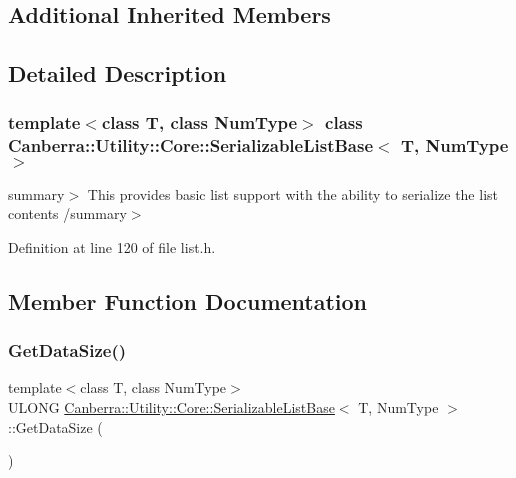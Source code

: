 \subsection*{Additional Inherited Members}


\subsection{Detailed Description}
\subsubsection*{template$<$class T, class Num\+Type$>$\newline
class Canberra\+::\+Utility\+::\+Core\+::\+Serializable\+List\+Base$<$ T, Num\+Type $>$}

summary$>$ This provides basic list support with the ability to serialize the list contents /summary$>$ 

Definition at line 120 of file list.\+h.



\subsection{Member Function Documentation}
\mbox{\label{class_canberra_1_1_utility_1_1_core_1_1_serializable_list_base_a98ebee1f5c5ff3357e2602c0201c95f0_a98ebee1f5c5ff3357e2602c0201c95f0}} 
\subsubsection{\texorpdfstring{Get\+Data\+Size()}{GetDataSize()}}
{\footnotesize\ttfamily template$<$class T, class Num\+Type$>$ \\
U\+L\+O\+NG \hyperlink{class_canberra_1_1_utility_1_1_core_1_1_serializable_list_base}{Canberra\+::\+Utility\+::\+Core\+::\+Serializable\+List\+Base}$<$ T, Num\+Type $>$\+::Get\+Data\+Size (\begin{DoxyParamCaption}{ }\end{DoxyParamCaption})\hspace{0.3cm}{\ttfamily [inline]}}



